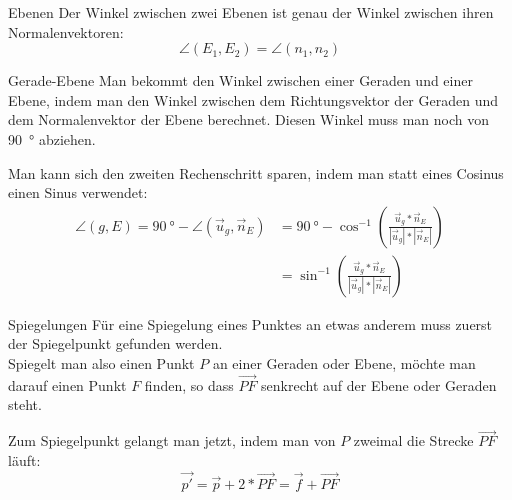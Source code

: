 \begin{bla}{Ebenen}
	Der Winkel zwischen zwei Ebenen ist genau der Winkel zwischen ihren Normalenvektoren:
	\[
	\angle(E_1,E_2) = \angle(n_1,n_2)
	\]
\end{bla}

\begin{bla}{Gerade-Ebene}
	Man bekommt den Winkel zwischen einer Geraden und einer Ebene, indem man den Winkel zwischen dem Richtungsvektor der Geraden und dem Normalenvektor der Ebene berechnet.
	Diesen Winkel muss man noch von \SI{90}{\degree} abziehen.

	Man kann sich den zweiten Rechenschritt sparen, indem man statt eines Cosinus einen Sinus verwendet:
	\begin{align*}
	\angle(g,E) = \SI{90}{\degree} - \angle(\vec u_g, \vec n_E)
	&= \SI{90}{\degree} - \cos^{-1} \left( \frac {\vec u_g * \vec n_E }{ |\vec u_g| * |\vec n_E| } \right)
	\\
	&= \sin^{-1} \left( \frac {\vec u_g * \vec n_E }{ |\vec u_g| * |\vec n_E| } \right)
	\end{align*}
\end{bla}

\begin{bla}
	{Spiegelungen}
	Für eine Spiegelung eines Punktes an etwas anderem muss zuerst der Spiegelpunkt gefunden werden.
	\\
	Spiegelt man also einen Punkt $P$ an einer Geraden oder Ebene, möchte man darauf einen Punkt $F$ finden, so dass $\overrightarrow{PF}$ senkrecht auf der Ebene oder Geraden steht.

	Zum Spiegelpunkt gelangt man jetzt, indem man von $P$ zweimal die Strecke $\overrightarrow{PF}$ läuft:
	\[
	\vec{p'} = \vec{p} + 2* \overrightarrow{PF} = \vec{f} + \overrightarrow{PF}
	\]
\end{bla}
